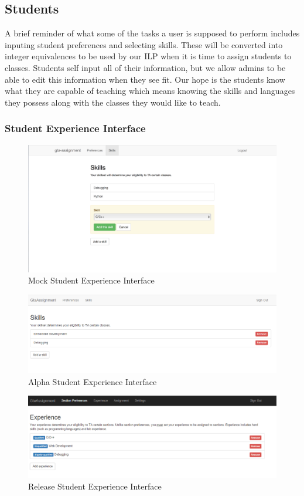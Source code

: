 \subsection{Students}

A brief reminder of what some of the tasks a user is supposed to perform includes inputing student preferences and selecting skills.
These will be converted into integer equivalences to be used by our ILP when it is time to assign students to classes.
Students self input all of their information, but we allow admins to be able to edit this information when they see fit.
Our hope is the students know what they are capable of teaching which means knowing the skills and languages they possess along with the classes they would like to teach.

\subsubsection{Student Experience Interface}

\begin{figure}[!htb]
  \centering
  \includegraphics[width=0.75\linewidth]{images/student-experience-design.png}
  \caption{Mock Student Experience Interface}
\end{figure}
\begin{figure}[!htb]
  \centering
  \includegraphics[width=0.75\linewidth]{images/student-experience-alpha.png}
  \caption{Alpha Student Experience Interface}
\end{figure}
\begin{figure}[!htb]
  \centering
  \includegraphics[width=0.75\linewidth]{images/student-experience-beta.png}
  \caption{Release Student Experience Interface}
\end{figure}

